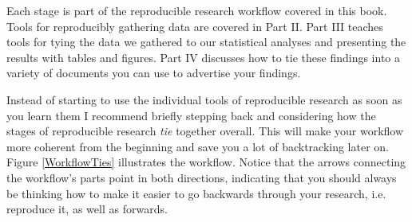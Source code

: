 \noindent Each stage is part of the reproducible research workflow covered in this book. Tools for reproducibly gathering data are covered in Part II. Part III teaches tools for tying the data we gathered to our statistical analyses and presenting the results with tables and figures. Part IV discusses how to tie these findings into a variety of documents you can use to advertise your findings.

Instead of starting to use the individual tools of reproducible research  as soon as you learn them I recommend briefly stepping back and considering how the stages of reproducible research {\emph{tie}} together overall. This will make your workflow more coherent from the beginning and save you a lot of backtracking later on.  Figure \ref{WorkflowTies} illustrates the workflow. Notice that the arrows connecting the workflow's parts point in both directions, indicating that you should always be thinking how to make it easier to go backwards through your research, i.e. reproduce it, as well as forwards. 

